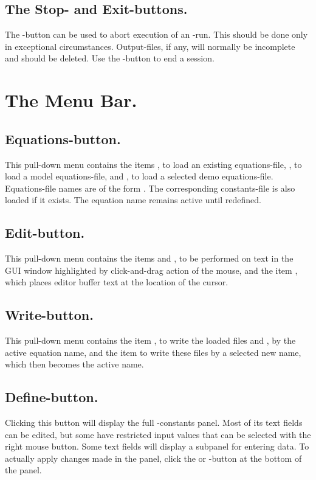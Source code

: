 \subsection{ The Stop- and Exit-buttons.}
The -button can be used to abort execution of an \AUTO-run.
This should be done only in exceptional circumstances.
Output-files, if any, will normally be incomplete and should be deleted.
Use the -button to end a session.


\section{ The Menu Bar.} \label{sec:GUI_Menu_bar}
\subsection{ Equations-button.}
This pull-down menu contains the items
, to load an existing equations-file,
, to load a model equations-file,
and
, to load a selected demo equations-file.
Equations-file names are of the form .
The corresponding constants-file  is also loaded if it exists.
The equation name  remains active until redefined.

\subsection{ Edit-button.}
This pull-down menu contains the items
 and , 
to be performed on text in the GUI window
highlighted by click-and-drag action of the mouse,
and the item , which places editor buffer text at the
location of the cursor.



\subsection{ Write-button.}
This pull-down menu contains the item
,
to write the loaded files  and ,
by the active equation name,
and the item
to write these files by a selected new name, which then becomes the active name.


\subsection{ Define-button.}
Clicking this button will display the full \AUTO-constants panel.
Most of its text fields can be edited,
but some have restricted input values that can be selected with
the right mouse button.
Some text fields will display a subpanel for entering data.
To actually apply changes made in the panel, click the
 or -button at the bottom of the panel.




